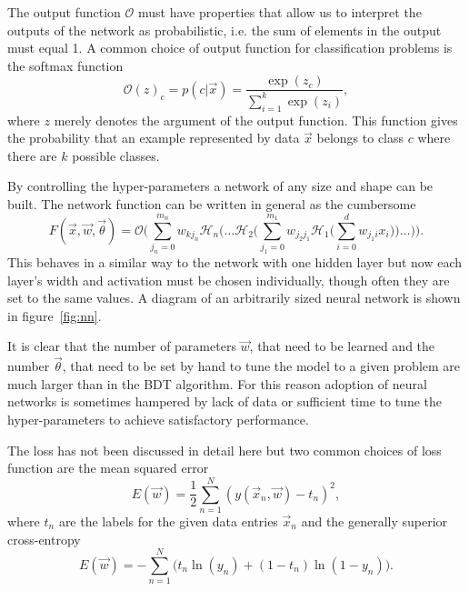 The output function $\mathcal{O}$ must have properties that allow us to
interpret the outputs of the network as probabilistic, i.e. the sum of elements
in the output must equal 1. A common choice of output function for
classification problems is the softmax function
\begin{equation}
  \mathcal{O}(z)_c = p(c|\vec{x}) = \frac{\exp(z_c)}{\sum_{i=1}^k\exp(z_i)},
  \label{eq:softmax}
\end{equation}
where $z$ merely denotes the argument of the output function. This function
gives the probability that an example represented by data $\vec{x}$ belongs to
class $c$ where there are $k$ possible classes.

By controlling the hyper-parameters a network of any size and shape can be
built. The network function can be written in general as the cumbersome
\begin{equation}
  F(\vec{x}, \vec{w}, \vec{\theta}) = \mathcal{O} \Bigg( \sum_{j_{n}=0}^{m_{n}} w_{kj_{n}}
  \mathcal{H}_{n} \Bigg( \dots \mathcal{H}_2  \Bigg( \sum_{j_{1}=0}^{m_{1}} w_{j_{2}j_{1}} 
  \mathcal{H}_{1} \Bigg( \sum_{i=0}^{d} w_{j_{1}i} x_{i} \Bigg) \Bigg) \dots \Bigg) \Bigg).
  \label{eq:fullnn}
\end{equation}
This behaves in a similar way to the network with one hidden layer but now each
layer's width and activation must be chosen individually, though often they are
set to the same values. A diagram of an arbitrarily sized neural network is
shown in figure~\ref{fig:nn}.

It is clear that the number of parameters $\vec{w}$, that need to be learned and
the number $\vec{\theta}$, that need to be set by hand to tune the model to a
given problem are much larger than in the BDT algorithm. For this reason
adoption of neural networks is sometimes hampered by lack of data or sufficient
time to tune the hyper-parameters to achieve satisfactory performance.

The loss has not been discussed in detail here but two common choices of
loss function are the mean squared error
\begin{equation}
E(\vec{w}) = \frac{1}{2}\sum_{n=1}^{N}(y(\vec{x}_n, \vec{w}) - t_n)^2,
\label{eq:MSE}
\end{equation}
where $t_n$ are the labels for the given data entries $\vec{x}_n$ and the
generally superior cross-entropy~\cite{XEntropySimard}
\begin{equation}
E(\vec{w}) = - \sum_{n=1}^{N} \Bigg (t_n \ln (y_n) + (1-t_n) \ln (1-y_n) \Bigg).
\label{eq:xentropy}
\end{equation}

